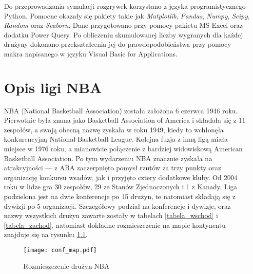 \documentclass[inzynierska]{pwr_wmat_praca_dyplomowa}
\theoremstyle{plain}
\numberwithin{theorem}{chapter}
\theoremstyle{definition}
\numberwithin{theorem}{chapter}
\begin{document}
\hspace*{6mm}Do przeprowadzania symulacji rozgrywek korzystano z języka programistycznego Python. Pomocne okazały się pakiety takie jak \textit{Matplotlib}, \textit{Pandas}, \textit{Numpy}, \textit{Scipy}, \textit{Random} oraz \textit{Seaborn}. Dane przygotowano przy pomocy pakietu MS Excel oraz dodatku Power Query. Po obliczeniu skumulowanej liczby wygranych dla każdej drużyny dokonano przekształcenia jej do prawdopodobieństwa przy pomocy makra napisanego w języku Visual Basic for Applications.


\chapter{Opis ligi NBA}\label{rodzial1}
NBA (National Basketball Association) została założona 6 czerwca 1946 roku. Pierwotnie była znana jako Basketball Association of America i składała się z 11 zespołów, a swoją obecną nazwę zyskała w roku 1949, kiedy to wchłonęła konkurencyjną National Basketball League. Kolejna fuzja z inną ligą miała miejsce w 1976 roku, a mianowicie połączenie z bardziej widowiskową American Basketball Association. Po tym wydarzeniu NBA znacznie zyskała na atrakcyjności --- z ABA zaczerpnięto pomysł rzutów za trzy punkty oraz organizację konkursu wsadów, jak i przyjęto cztery dodatkowe kluby\cite{history}. Od 2004 roku w lidze gra 30 zespołów, 29 ze Stanów Zjednoczonych i 1 z Kanady. Liga podzielona jest na dwie konferencje po 15 drużyn, te natomiast składają się z dywizji po 5 organizacji. Szczegółowy podział na konferencje i dywizje, oraz nazwy wszystkich drużyn zawarte zostały w tabelach \ref{tabela_wschod} i \ref{tabela_zachod}, natomiast dokładne rozmieszczenie na mapie kontynentu znajduje się na rysunku \ref{mapa_stany}\cite{mapa}.

\begin{figure}[t]
	\texttt{[image: conf\_map.pdf]}
	\caption{Rozmieszczenie drużyn NBA \cite{mapa}}\label{mapa_stany}
	\centering
\end{figure}
\end{document}
